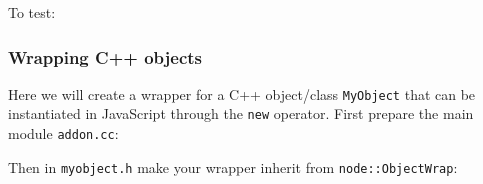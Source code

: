 To test:

\begin{Shaded}
\begin{Highlighting}[]
 \NormalTok{);}

 
\end{Highlighting}
\end{Shaded}

\subsubsection{Wrapping C++ objects}

Here we will create a wrapper for a C++ object/class \texttt{MyObject}
that can be instantiated in JavaScript through the \texttt{new}
operator. First prepare the main module \texttt{addon.cc}:

\begin{Shaded}
\begin{Highlighting}[]
\NormalTok{>}


 
\NormalTok{\}}

\end{Highlighting}
\end{Shaded}

Then in \texttt{myobject.h} make your wrapper inherit from
\texttt{node::ObjectWrap}:

